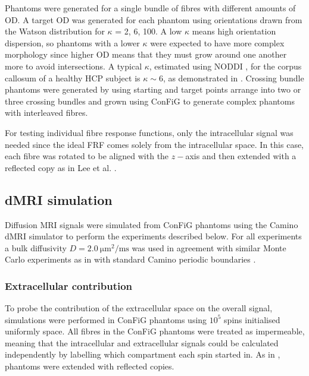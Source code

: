 Phantoms were generated for a single bundle of fibres with different amounts of \ac{OD}. A target \ac{OD} was generated for each phantom using orientations drawn from the Watson distribution \cite{Mardia2008} for $\kappa$ = 2, 6, 100.
A low $\kappa$ means high orientation dispersion, so phantoms with a lower $\kappa$ were expected to have more complex morphology since higher \ac{OD} means that they must grow around one another more to avoid intersections. A typical $\kappa$, estimated using \ac{NODDI} \cite{Zhang2012}, for the corpus callosum of a healthy \ac{HCP} \cite{Sotiropoulos2013a,VanEssen2012} subject is $\kappa \sim 6$, as demonstrated in .
Crossing bundle phantoms were generated by using starting and target points arrange into two or three crossing bundles and grown using \ac{ConFiG} to generate complex phantoms with interleaved fibres.

For testing individual fibre response functions, only the intracellular signal was needed since the ideal \ac{FRF} comes solely from the intracellular space. In this case, each fibre was rotated to be aligned with the $z-$axis and then extended with a reflected copy as in Lee et al. \cite{Lee2019a}.


\subsection{dMRI simulation}
\label{sec:frf_dMRI_simulation}
Diffusion MRI signals were simulated from ConFiG phantoms using the Camino \ac{dMRI} simulator \cite{Cook2006,Hall2009} to perform the experiments described below. For all experiments a bulk diffusivity $D = \SI{2.0}{\micro\metre\squared\per\milli\second}$ was used in agreement with similar Monte Carlo experiments as in  with standard Camino periodic boundaries \cite{Panagiotaki2010}.

\subsubsection{Extracellular contribution}
\label{sec:frf_method_extra}
To probe the contribution of the extracellular space on the overall signal, simulations were performed in \ac{ConFiG} phantoms using $10^5$ spins initialised uniformly space. All fibres in the \ac{ConFiG} phantoms were treated as impermeable, meaning that the intracellular and extracellular signals could be calculated independently by labelling which compartment each spin started in. As in , phantoms were extended with reflected copies.

